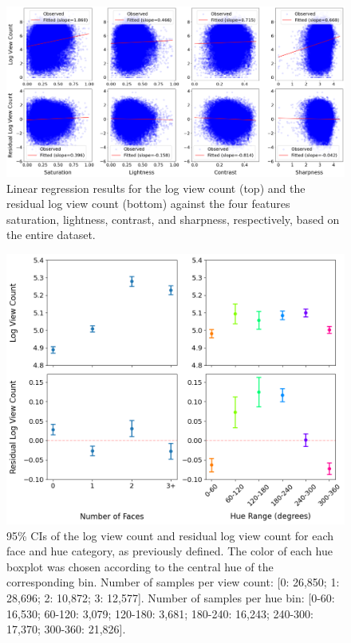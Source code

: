 \documentclass{article}
\begin{document}
\begin{figure}[h]


  \centering
  \includegraphics[width=\textwidth]{figs/lr.png}
  \caption{Linear regression results for the log view count (top) and the residual log view count (bottom) against the four features saturation, lightness, contrast, and sharpness, respectively, based on the entire dataset.}
  \label{fig:lr}
\end{figure}

\begin{figure}[h]
  \begin{minipage}[t]{0.67\textwidth}
    \vspace{0pt}  %
    \includegraphics[width=\textwidth]{figs/faces-and-hue.png}
  \end{minipage}%
  \hspace{0.05\textwidth}%
  \begin{minipage}[t]{0.27\textwidth}
    \vspace{0pt}  %
    \caption{95\% CIs of the log view count and residual log view count for each face and hue category, as previously defined. The color of each hue boxplot was chosen according to the central hue of the corresponding bin. Number of samples per view count: [0: 26,850; 1: 28,696; 2: 10,872; 3: 12,577]. Number of samples per hue bin: [0-60: 16,530; 60-120: 3,079; 120-180: 3,681; 180-240: 16,243; 240-300: 17,370; 300-360: 21,826].}
    \label{fig:faces-and-hue}
  \end{minipage}
\end{figure}
\end{document}
